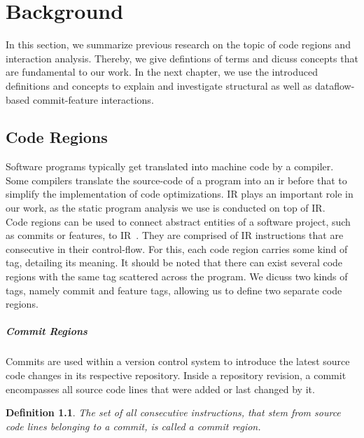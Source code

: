 \chapter{Background}\label{ch:background}

In this section, we summarize previous research on the topic of code regions and interaction analysis.
Thereby, we give defintions of terms and dicuss concepts that are fundamental to our work.
In the next chapter, we use the introduced definitions and concepts to explain and investigate structural as well as dataflow-based commit-feature interactions.

\section{Code Regions}\label{ch:code_regions}
Software programs typically get translated into machine code by a compiler.
Some compilers translate the source-code of a program into an \ac{ir} before that to simplify the implementation of code optimizations.
IR plays an important role in our work, as the static program analysis we use is conducted on top of IR. \\
Code regions can be used to connect abstract entities of a software project, such as commits or features, to IR~\cite{sattler2023seal}.
They are comprised of IR instructions that are consecutive in their control-flow.
For this, each code region carries some kind of tag, detailing its meaning.
It should be noted that there can exist several code regions with the same tag scattered across the program.
We dicuss two kinds of tags, namely commit and feature tags, allowing us to define two separate code regions. 

\paragraph{Commit Regions}\label{sec:commit_regions}

Commits are used within a version control system to introduce the latest source code changes in its respective repository.
Inside a repository revision, a commit encompasses all source code lines that were added or last changed by it. 

\newtheorem{definition}{Definition}
\newcommand{\definitionautorefname}{Definition}
\begin{definition}\label{def:commit_regions}
	\emph{The set of all consecutive instructions, that stem from source code lines belonging to a commit, is called a} commit region.
\end{definition}


